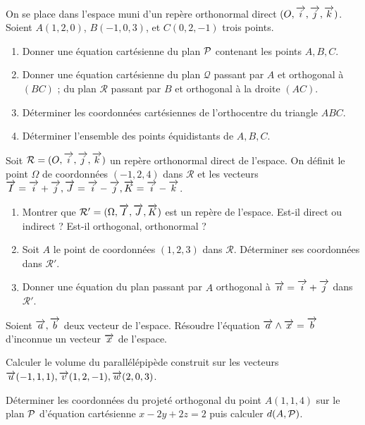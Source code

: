 \begin{exercice}
    On se place dans l'espace muni d'un repère orthonormal direct \((O, \vi, \vj, \vk)\). Soient \(A(1,2,0)\), \(B(-1,0,3)\), et \(C(0,2,-1)\) trois points.
    \begin{enumerate}
        \item Donner une équation cartésienne du plan \(\P\) contenant les points \(A, B, C\).
        \item Donner une équation cartésienne du plan \(\mathcal{Q}\) passant par \(A\) et orthogonal à \((BC)\) ; du plan \(\mathcal{R}\) passant par \(B\) et orthogonal à la droite \((AC)\).
        \item Déterminer les coordonnées cartésiennes de l'orthocentre du triangle \(ABC\).
        \item Déterminer l'ensemble des points équidistants de \(A, B, C\).
    \end{enumerate}
\end{exercice}
\begin{exercice}
    Soit \(\mathcal{R} = (O, \vi, \vj, \vk)\) un repère orthonormal direct de l'espace. On définit le point \(\Omega\) de coordonnées \((-1,2,4)\) dans \(\mathcal{R}\) et les vecteurs \(\vect{I} = \vi+\vj, \vect{J} = \vi - \vj, \vect{K} = \vi - \vk\).
    \begin{enumerate}
        \item Montrer que \(\mathcal{R}' = (\Omega, \vect{I}, \vect{J}, \vect{K})\) est un repère de l'espace. Est-il direct ou indirect ? Est-il orthogonal, orthonormal ?
        \item Soit \(A\) le point de coordonnées \((1, 2, 3)\) dans \(\mathcal{R}\). Déterminer ses coordonnées dans \(\mathcal{R}'\).
        \item Donner une équation du plan passant par \(A\) orthogonal à \(\vn = \vi + \vj\) dans \(\mathcal{R}'\).
    \end{enumerate}
\end{exercice}
\begin{exercice}
    Soient \(\va, \vb\) deux vecteur de l'espace. Résoudre l'équation \(\va \wedge \vect{x} = \vb\) d'inconnue un vecteur \(\vect{x}\) de l'espace.
\end{exercice}
\begin{exercice}
    Calculer le volume du parallélépipède construit sur les vecteurs \(\vu(-1,1,1), \vv(1,2,-1), \vw(2,0,3)\).
\end{exercice}
\begin{exercice}
    Déterminer les coordonnées du projeté orthogonal du point \(A(1,1,4)\) sur le plan \(\P\) d'équation cartésienne \(x-2y+2z = 2\) puis calculer \(d(A,\P)\).
\end{exercice}
